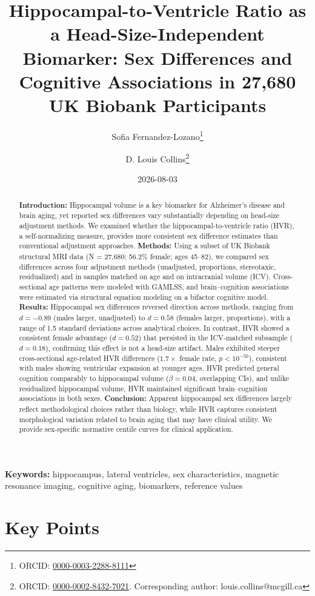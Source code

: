 \documentclass[
]{article}
\title{Hippocampal-to-Ventricle Ratio as a Head-Size-Independent
Biomarker: Sex Differences and Cognitive Associations in 27,680 UK
Biobank Participants}
\author[1,2]{Sofia
Fernandez-Lozano\thanks{ORCID: \href{https://orcid.org/0000-0003-2288-8111}{0000-0003-2288-8111}}}
\author[1,2,3]{D. Louis
Collins\thanks{ORCID: \href{https://orcid.org/0000-0002-8432-7021}{0000-0002-8432-7021}. Corresponding author: louis.collins@mcgill.ca}}
\affil[1]{Montreal Neurological Institute, McConnell Brain Imaging
Centre, Montreal, Quebec, Canada}
\affil[2]{Department of Neurology and Neurosurgery, McGill
University, Montreal, Quebec, Canada}
\affil[3]{Department of Biomedical Engineering, McGill
University, Montreal, Quebec, Canada}
\date{2026-08-03}
\begin{document}
\maketitle
\begin{abstract}
\textbf{Introduction:} Hippocampal volume is a key biomarker for
Alzheimer's disease and brain aging, yet reported sex differences vary
substantially depending on head-size adjustment methods. We examined
whether the hippocampal-to-ventricle ratio (HVR), a self-normalizing
measure, provides more consistent sex difference estimates than
conventional adjustment approaches. \textbf{Methods:} Using a subset of
UK Biobank structural MRI data (N = 27,680; 56.2\% female; ages 45--82),
we compared sex differences across four adjustment methods (unadjusted,
proportions, stereotaxic, residualized) and in samples matched on age
and on intracranial volume (ICV). Cross-sectional age patterns were
modeled with GAMLSS, and brain--cognition associations were estimated
via structural equation modeling on a bifactor cognitive model.
\textbf{Results:} Hippocampal sex differences reversed direction across
methods, ranging from \(d = -0.89\) (males larger, unadjusted) to
\(d = 0.58\) (females larger, proportions), with a range of 1.5 standard
deviations across analytical choices. In contrast, HVR showed a
consistent female advantage (\(d = 0.52\)) that persisted in the
ICV-matched subsample (\(d = 0.18\)), confirming this effect is not a
head-size artifact. Males exhibited steeper cross-sectional age-related
HVR differences (\(1.7\times\) female rate, \(p < 10^{-50}\)),
consistent with males showing ventricular expansion at younger ages. HVR
predicted general cognition comparably to hippocampal volume
(\(\beta = 0.04\), overlapping CIs), and unlike residualized hippocampal
volume, HVR maintained significant brain--cognition associations in both
sexes. \textbf{Conclusion:} Apparent hippocampal sex differences largely
reflect methodological choices rather than biology, while HVR captures
consistent morphological variation related to brain aging that may have
clinical utility. We provide sex-specific normative centile curves for
clinical application.
\end{abstract}


\textbf{Keywords:} hippocampus, lateral ventricles, sex characteristics,
magnetic resonance imaging, cognitive aging, biomarkers, reference
values

\section*{Key Points}\label{key-points}
\end{document}
